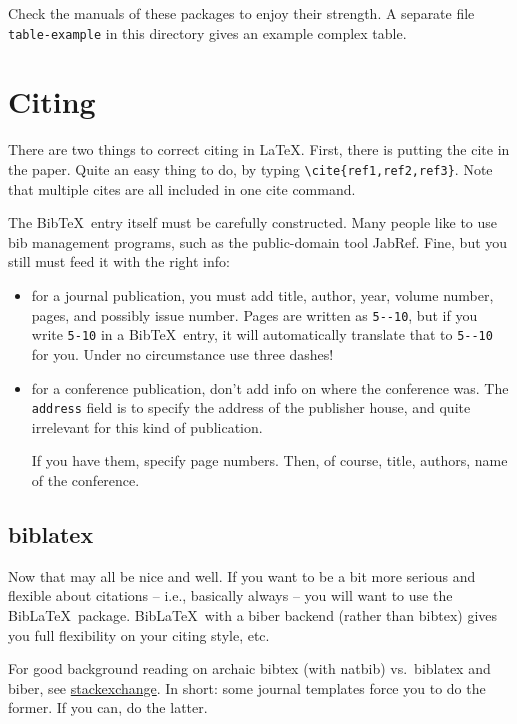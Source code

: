 \documentclass{article}
\begin{document}
Check the manuals of these packages to enjoy their strength.  A separate file  \texttt{table-example} in this directory gives an example complex table.





\section{Citing}
There are two things to correct citing in \LaTeX.  First, there is putting the cite in the paper. Quite an easy thing to do, by typing \verb+\cite{ref1,ref2,ref3}+. Note that multiple cites are all included in one cite command.

The Bib\TeX\ entry itself must be carefully constructed.  Many people like to use bib management programs, such as the public-domain tool JabRef.  Fine, but you still must feed it with the right info:
\begin{itemize}
\item for a journal publication, you must add title, author, year, volume number,
pages, and possibly issue number.  Pages are written as \verb+5--10+, but if you write \verb+5-10+ in a Bib\TeX\ entry, it will automatically translate that to \verb+5--10+ for you.  Under no circumstance use three dashes!

\item for a conference publication, don't add info on where the conference was. The \verb+address+ field is to specify the address of the publisher house, and quite irrelevant for this kind of publication.

If you have them, specify page numbers.  Then, of course, title, authors, name of the  conference.
\end{itemize}

\subsection{biblatex}
Now that may all be nice and well.  
If you want to be a bit more serious and flexible about citations -- i.e., basically always -- you will want to use the Bib\LaTeX\ package.
Bib\LaTeX\ with a biber backend (rather than bibtex) gives you full flexibility on your citing style, etc.

For good background reading on archaic bibtex (with natbib) vs.\ biblatex and biber, see \href{https://tex.stackexchange.com/questions/25701/bibtex-vs-biber-and-biblatex-vs-natbib}{stackexchange}.
In short: some journal templates force you to do the former.
If you can, do the latter.
\end{document}
